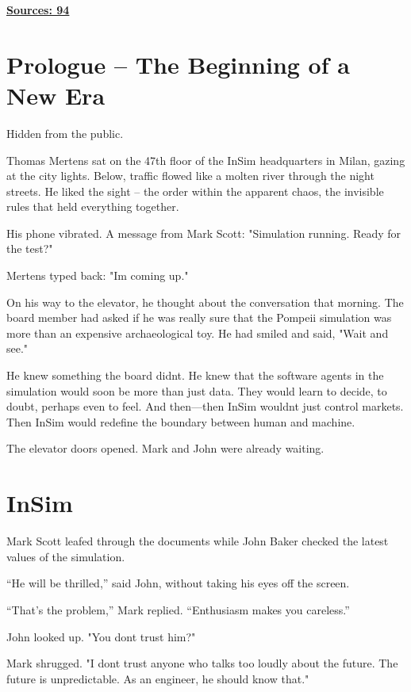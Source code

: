 \documentclass[
]{article}
\begin{document}
\hyperref[sources]{\textbf{Sources: 94}}

\section{Prologue -- The Beginning of a New Era}\label{prologue-the-beginning-of-a-new-era}

Hidden from the public.

Thomas Mertens sat on the 47th floor of the InSim headquarters in Milan, gazing at the city lights. Below, traffic flowed like a molten river through the night streets. He liked the sight -- the order within the apparent chaos, the invisible rules that held everything together.

His phone vibrated. A message from Mark Scott: "Simulation running. Ready for the test?"

Mertens typed back: "I\textquotesingle m coming up."

On his way to the elevator, he thought about the conversation that morning. The board member had asked if he was really sure that the Pompeii simulation was more than an expensive archaeological toy. He had smiled and said, "Wait and see."

He knew something the board didn\textquotesingle t. He knew that the software agents in the simulation would soon be more than just data. They would learn to decide, to doubt, perhaps even to feel. And then---then InSim wouldn\textquotesingle t just control markets. Then InSim would redefine the boundary between human and machine.

The elevator doors opened. Mark and John were already waiting.

\section{InSim}\label{insim}

Mark Scott leafed through the documents while John Baker checked the latest values \hspace{0pt}\hspace{0pt}of the simulation.

``He will be thrilled,'' said John, without taking his eyes off the screen.

``That's the problem,'' Mark replied. ``Enthusiasm makes you careless.''

John looked up. "You don\textquotesingle t trust him?"

Mark shrugged. "I don\textquotesingle t trust anyone who talks too loudly about the future. The future is unpredictable. As an engineer, he should know that."
\end{document}
